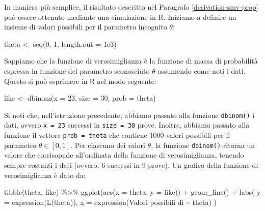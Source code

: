 \documentclass[
  11pt,
]{krantz}
\makeatletter
\newenvironment{Shaded}{\begin{snugshade}}{\end{snugshade}}
\newcommand{\AttributeTok}[1]{\textcolor[rgb]{0.61,0.61,0.61}{#1}}
\newcommand{\DecValTok}[1]{\textcolor[rgb]{0.06,0.06,0.06}{#1}}
\newcommand{\FloatTok}[1]{\textcolor[rgb]{0.06,0.06,0.06}{#1}}
\newcommand{\FunctionTok}[1]{\textcolor[rgb]{0,0,0}{#1}}
\newcommand{\NormalTok}[1]{#1}
\newcommand{\OtherTok}[1]{\textcolor[rgb]{0.37,0.37,0.37}{#1}}
\newcommand{\SpecialCharTok}[1]{\textcolor[rgb]{0,0,0}{#1}}
\newcommand{\StringTok}[1]{\textcolor[rgb]{0.5,0.5,0.5}{#1}}
\newenvironment{kframe}{%
\medskip{}
\setlength{\fboxsep}{.8em}
 \def\at@end@of@kframe{}%
 \ifinner\ifhmode%
  \def\at@end@of@kframe{\end{minipage}}%
  \begin{minipage}{\columnwidth}%
 \fi\fi%
 \def\FrameCommand##1{\hskip\@totalleftmargin \hskip-\fboxsep
 \colorbox{shadecolor}{##1}\hskip-\fboxsep
     \hskip-\linewidth \hskip-\@totalleftmargin \hskip\columnwidth}%
 \MakeFramed {\advance\hsize-\width
   \@totalleftmargin\z@ \linewidth\hsize
   \@setminipage}}%
 {\par\unskip\endMakeFramed%
 \at@end@of@kframe}
\renewenvironment{Shaded}{\begin{kframe}}{\end{kframe}}
\newcommand{\R}{\textsf{R}} %
\theoremstyle{definition}
\theoremstyle{definition}
\theoremstyle{definition}
\theoremstyle{definition}
\theoremstyle{remark}
\makeatother
\begin{document}
In maniera più semplice, il risultato descritto nel Paragrafo \ref{derivation-smv-prop} può essere ottenuto mediante una simulazione in \R. Iniziamo a definire un insieme di valori possibili per il parametro incognito \(\theta\):

\begin{Shaded}
\begin{Highlighting}[]
\NormalTok{theta }\OtherTok{\textless{}{-}} \FunctionTok{seq}\NormalTok{(}\DecValTok{0}\NormalTok{, }\DecValTok{1}\NormalTok{, }\AttributeTok{length.out =} \FloatTok{1e3}\NormalTok{)}
\end{Highlighting}
\end{Shaded}

Sappiamo che la funzione di verosimiglianza è la funzione di massa di probabilità espressa in funzione del parametro sconosciuto \(\theta\) assumendo come noti i dati. Questo si può esprimere in \(\R\) nel modo seguente:

\begin{Shaded}
\begin{Highlighting}[]
\NormalTok{like }\OtherTok{\textless{}{-}} \FunctionTok{dbinom}\NormalTok{(}\AttributeTok{x =} \DecValTok{23}\NormalTok{, }\AttributeTok{size =} \DecValTok{30}\NormalTok{, }\AttributeTok{prob =}\NormalTok{ theta)}
\end{Highlighting}
\end{Shaded}

Si noti che, nell'istruzione precedente, abbiamo passato alla funzione \texttt{dbinom()} i dati, ovvero \texttt{x\ =\ 23} successi in \texttt{size\ =\ 30} prove. Inoltre, abbiamo passato alla funzione il vettore \texttt{prob\ =\ theta} che contiene 1000 valori possibili per il parametro \(\theta \in [0, 1]\). Per ciascuno dei valori \(\theta\), la funzione \texttt{dbinom()} ritorna un valore che corrisopnde all'ordinata della funzione di verosimiglianza, tenendo sempre costanti i dati (ovvero, 6 successi in 9 prove). Un grafico della funzione di verosimiglianza è dato da:

\begin{Shaded}
\begin{Highlighting}[]
\FunctionTok{tibble}\NormalTok{(theta, like) }\SpecialCharTok{\%\textgreater{}\%} 
  \FunctionTok{ggplot}\NormalTok{(}\FunctionTok{aes}\NormalTok{(}\AttributeTok{x =}\NormalTok{ theta, }\AttributeTok{y =}\NormalTok{ like)) }\SpecialCharTok{+}
  \FunctionTok{geom\_line}\NormalTok{() }\SpecialCharTok{+}
  \FunctionTok{labs}\NormalTok{(}
    \AttributeTok{y =} \FunctionTok{expression}\NormalTok{(}\FunctionTok{L}\NormalTok{(theta)),}
    \AttributeTok{x =} \FunctionTok{expression}\NormalTok{(}\StringTok{\textquotesingle{}Valori possibili di\textquotesingle{}} \SpecialCharTok{\textasciitilde{}}\NormalTok{ theta)}
\NormalTok{  )}
\end{Highlighting}
\end{Shaded}
\end{document}
